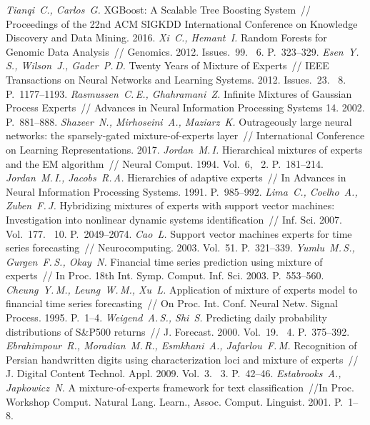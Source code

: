 \begin{thebibliography}{10}
	\textit{Tianqi~C., Carlos~G.} XGBoost: A Scalable Tree Boosting System~// Proceedings of the 22nd ACM SIGKDD International Conference on Knowledge Discovery and Data Mining. 2016.
	\textit{Xi~C., Hemant~I.} Random Forests for Genomic Data Analysis~// Genomics. 2012. Issues.~99. \No~6. P.~323--329.
	\textit{Esen~Y.\,S., Wilson~J., Gader~P.\,D.} Twenty Years of Mixture of Experts~// IEEE Transactions on Neural Networks and Learning Systems. 2012. Issues.~23. \No~8. P.~1177--1193.
	\textit{Rasmussen~C.\,E., Ghahramani~Z.} Infinite Mixtures of Gaussian Process Experts~// Advances in Neural Information Processing Systems 14. 2002. P.~881--888.
	\textit{Shazeer~N., Mirhoseini~A., Maziarz~K.} Outrageously large neural networks: the sparsely-gated mixture-of-experts layer~//  International Conference on Learning Representations. 2017.
	\textit{Jordan~M.\,I.} Hierarchical mixtures of experts and the EM algorithm~// Neural Comput. 1994. Vol.~6, \No~2. P.~181--214.
	\textit{Jordan~M.\,I., Jacobs~R.\,A.} Hierarchies of adaptive experts~// In Advances in Neural Information Processing Systems. 1991. P.~985--992.
	\textit{Lima~C., Coelho~A., Zuben~F.\,J.} Hybridizing mixtures of experts with support vector machines: Investigation into nonlinear dynamic systems identification~// Inf. Sci. 2007. Vol.~177. \No~10. P.~2049--2074.
	\textit{Cao~L.} Support vector machines experts for time series forecasting~// Neurocomputing. 2003. Vol.~51. P.~321--339.
	\textit{Yumlu~M.\,S., Gurgen~F.\,S.,  Okay~N.} Financial time series prediction using mixture of experts~// In Proc. 18th Int. Symp. Comput. Inf. Sci. 2003. P.~553--560.
	\textit{Cheung~Y.\,M., Leung~W.\,M., Xu~L.} Application of mixture of experts model to financial time series forecasting~// On Proc. Int. Conf. Neural Netw. Signal Process. 1995. P.~1--4.
	\textit{Weigend~A.\,S., Shi~S.} Predicting daily probability distributions of S\&P500 returns~// J. Forecast. 2000. Vol.~19. \No~4. P.~375--392.
	\textit{Ebrahimpour~R., Moradian~M.\,R., Esmkhani~A., Jafarlou~F.\,M.} Recognition of Persian handwritten digits using characterization loci and mixture of experts~// J. Digital Content Technol. Appl. 2009. Vol.~3. \No~3. P.~42--46.
	\textit{Estabrooks~A., Japkowicz~N.} A mixture-of-experts framework for text classification~//In Proc. Workshop Comput. Natural Lang. Learn., Assoc. Comput. Linguist. 2001. P.~1--8.

\end{thebibliography}
